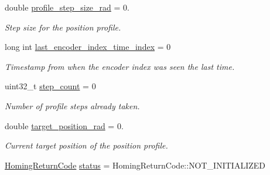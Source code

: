 \begin{DoxyCompactItemize}
\mbox{\label{structblmc__robots_1_1HomingState_a06b1c01870f9531cbe766728603f468b}} 
double \hyperlink{structblmc__robots_1_1HomingState_a06b1c01870f9531cbe766728603f468b}{profile\+\_\+step\+\_\+size\+\_\+rad} = 0.
\begin{DoxyCompactList}\small\item\em Step size for the position profile. \end{DoxyCompactList}\item 
\mbox{\label{structblmc__robots_1_1HomingState_a770422e8764a847278e5353e2ebe57a6}} 
long int \hyperlink{structblmc__robots_1_1HomingState_a770422e8764a847278e5353e2ebe57a6}{last\+\_\+encoder\+\_\+index\+\_\+time\+\_\+index} = 0
\begin{DoxyCompactList}\small\item\em Timestamp from when the encoder index was seen the last time. \end{DoxyCompactList}\item 
\mbox{\label{structblmc__robots_1_1HomingState_a16adc4753efe03def5ef3ebf7abc632c}} 
uint32\+\_\+t \hyperlink{structblmc__robots_1_1HomingState_a16adc4753efe03def5ef3ebf7abc632c}{step\+\_\+count} = 0
\begin{DoxyCompactList}\small\item\em Number of profile steps already taken. \end{DoxyCompactList}\item 
\mbox{\label{structblmc__robots_1_1HomingState_a72a681755f52b727ddca35e3811fa5f5}} 
double \hyperlink{structblmc__robots_1_1HomingState_a72a681755f52b727ddca35e3811fa5f5}{target\+\_\+position\+\_\+rad} = 0.
\begin{DoxyCompactList}\small\item\em Current target position of the position profile. \end{DoxyCompactList}\item 
\mbox{\label{structblmc__robots_1_1HomingState_af821e232c974385ae24e20a7f75665f7}} 
\hyperlink{blmc__joint__module_8hpp_aa1075809042ff261e4b0a20d161448b6}{Homing\+Return\+Code} \hyperlink{structblmc__robots_1_1HomingState_af821e232c974385ae24e20a7f75665f7}{status} = Homing\+Return\+Code\+::\+N\+O\+T\+\_\+\+I\+N\+I\+T\+I\+A\+L\+I\+Z\+ED

\end{DoxyCompactItemize}
